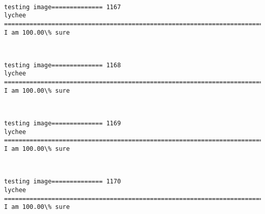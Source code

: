 \documentclass[11pt]{article}
\begin{document}
    \begin{center}
    \end{center}
    { \hspace*{\fill} \\}
    
    \begin{Verbatim}[commandchars=\\\{\}]
testing image============== 1167
lychee
============================================================================
I am 100.00\% sure

    \end{Verbatim}

    \begin{center}
    \end{center}
    { \hspace*{\fill} \\}
    
    \begin{Verbatim}[commandchars=\\\{\}]
testing image============== 1168
lychee
============================================================================
I am 100.00\% sure

    \end{Verbatim}

    \begin{center}
    \end{center}
    { \hspace*{\fill} \\}
    
    \begin{Verbatim}[commandchars=\\\{\}]
testing image============== 1169
lychee
============================================================================
I am 100.00\% sure

    \end{Verbatim}

    \begin{center}
    \end{center}
    { \hspace*{\fill} \\}
    
    \begin{Verbatim}[commandchars=\\\{\}]
testing image============== 1170
lychee
============================================================================
I am 100.00\% sure

    \end{Verbatim}
\end{document}
